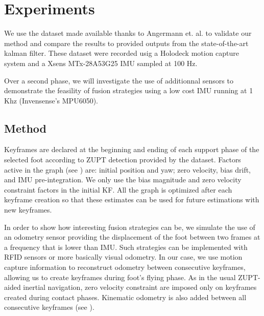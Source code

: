 
\section{Experiments} \label{sec:experiments}

We use the dataset made available thanks to Angermann et. al. \cite{angermann2010high} to validate our method and compare the results to provided outputs from the state-of-the-art kalman filter.
These dataset were recorded usig a Holodeck motion capture system and a Xsens MTx-28A53G25 IMU sampled at 100 Hz. 

Over a second phase, we will investigate the use of additionnal sensors to demonstrate the feasility of fusion strategies using a low cost IMU running at 1 Khz (Invensense's MPU6050).

\subsection{Method}

Keyframes are declared at the beginning and ending of each support phase of the selected foot according to ZUPT detection provided by the dataset. Factors active in the graph (see ) are: initial position and yaw; zero velocity, bias drift, and IMU pre-integration. We only use the bias magnitude 
and zero velocity constraint factors in the initial KF. All the graph is optimized after each keyframe creation so that these estimates can be used for future estimations with new keyframes.

In order to show how interesting fusion strategies can be, we simulate the use of an odometry sensor providing the displacement of the foot between two frames at a frequency that is lower than IMU. Such strategies can be implemented with
RFID sensors or more basically visual odometry. In our case, we use motion capture information to reconstruct odometry between consecutive keyframes, allowing us to create keyframes during foot's flying phase. As in the usual ZUPT-aided inertial
navigation, zero velocity constraint are imposed only on keyframes created during contact phases. Kinematic odometry is also added between all consecutive keyframes (see ).


